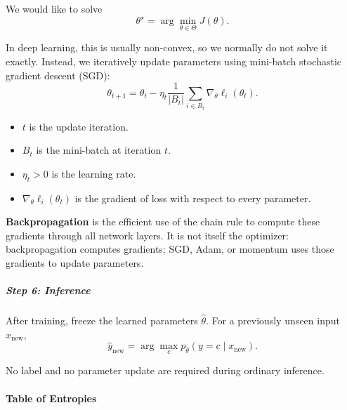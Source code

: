 \documentclass[11pt,a4paper]{article}
\theoremstyle{definition}
\begin{document}
We would like to solve
\[
\theta^\star = \arg \min_{\theta \in \Theta} J(\theta).
\]

In deep learning, this is usually non-convex, so we normally do not solve it exactly. Instead, we iteratively update parameters using mini-batch stochastic gradient descent (SGD):
\[
\theta_{t+1} = \theta_t - \eta_t \frac{1}{|B_t|} \sum_{i \in B_t} \nabla_\theta \ell_i(\theta_t).
\]

\begin{itemize}
    \item $t$ is the update iteration.
    \item $B_t$ is the mini-batch at iteration $t$.
    \item $\eta_t > 0$ is the learning rate.
    \item $\nabla_\theta \ell_i(\theta_t)$ is the gradient of loss with respect to every parameter.
\end{itemize}

\textbf{Backpropagation} is the efficient use of the chain rule to compute these gradients through all network layers. It is not itself the optimizer: backpropagation computes gradients; SGD, Adam, or momentum uses those gradients to update parameters.

\subparagraph{Step 6: Inference}

After training, freeze the learned parameters $\hat{\theta}$. For a previously unseen input $x_{\text{new}}$,
\[
\hat{y}_{\text{new}} = \arg \max_c p_{\hat{\theta}}(y = c \mid x_{\text{new}}).
\]

No label and no parameter update are required during ordinary inference.


\paragraph{Table of Entropies}

\noindent
\end{document}
